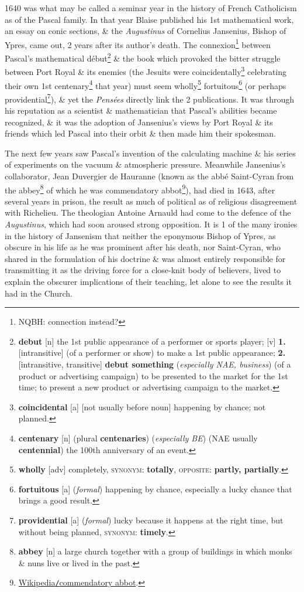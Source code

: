 \documentclass[oneside]{book}
\numberwithin{equation}{section}
\begin{document}
1640 was what may be called a seminar year in the history of French Catholicism as of the Pascal family. In that year Blaise published his 1st mathematical work, an essay on conic sections, \& the \textit{Augustinus} of Cornelius Jansenius, Bishop of Ypres, came out, 2 years after its author's death. The connexion\footnote{NQBH: connection instead?} between Pascal's mathematical d\'ebut\footnote{\textbf{debut} [n] the 1st public appearance of a performer or sports player; [v] \textbf{1.} [intransitive] (of a performer or show) to make a 1st public appearance; \textbf{2.} [intransitive, transitive] \textbf{debut something} (\textit{especially NAE, business}) (of a product or advertising campaign) to be presented to the market for the 1st time; to present a new product or advertising campaign to the market.} \& the book which provoked the bitter struggle between Port Royal \& its enemies (the Jesuits were coincidentally\footnote{\textbf{coincidental} [a] [not usually before noun] happening by chance; not planned.} celebrating their own 1st centenary\footnote{\textbf{centenary} [n] (plural \textbf{centenaries}) (\textit{especially BE}) (NAE usually \textbf{centennial}) the 100th anniversary of an event.} that year) must seem wholly\footnote{\textbf{wholly} [adv] completely, \textsc{synonym}: \textbf{totally}, \textsc{opposite}: \textbf{partly, partially}.} fortuitous\footnote{\textbf{fortuitous} [a] (\textit{formal}) happening by chance, especially a lucky chance that brings a good result.} (or perhaps providential\footnote{\textbf{providential} [a] (\textit{formal}) lucky because it happens at the right time, but without being planned, \textsc{synonym}: \textbf{timely}.}), \& yet the \textit{Pens\'ees} directly link the 2 publications. It was through his reputation as a scientist \& mathematician that Pascal's abilities became recognized, \& it was the adoption of Jansenius's views by Port Royal \& its friends which led Pascal into their orbit \& then made him their spokesman.

The next few years saw Pascal's invention of the calculating machine \& his series of experiments on the vacuum \& atmospheric pressure. Meanwhile Jansenius's collaborator, Jean Duvergier de Hauranne (known as the abb\'e Saint-Cyran from the abbey\footnote{\textbf{abbey} [n] a large church together with a group of buildings in which monks \& nuns live or lived in the past.} of which he was commendatory abbot\footnote{\href{https://en.wikipedia.org/wiki/Commendatory_abbot}{Wikipedia\texttt{/}commendatory abbot}.}), had died in 1643, after several years in prison, the result as much of political as of religious disagreement with Richelieu. The theologian Antoine Arnauld had come to the defence of the \textit{Augustinus}, which had soon aroused strong opposition. It is 1 of the many ironies in the history of Jansenism that neither the eponymous Bishop of Ypres, as obscure in his life as he was prominent after his death, nor Saint-Cyran, who shared in the formulation of his doctrine \& was almost entirely responsible for transmitting it as the driving force for a close-knit body of believers, lived to explain the obscurer implications of their teaching, let alone to see the results it had in the Church.
\end{document}
